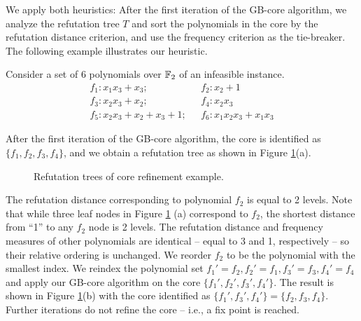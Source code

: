 
We apply both heuristics: After the first iteration of the GB-core
algorithm, we analyze the refutation tree $T$ and sort the polynomials
in the core by the refutation distance criterion, and use the
frequency criterion as the tie-breaker. The following example
illustrates our heuristic.  


\begin{Example} 
Consider a set of 6 polynomials over ${\mathbb{F}}_2$ of an
infeasible instance.
\begin{align*}
f_1: x_1x_3+x_3; & ~~~f_2: x_2 + 1\\
f_3: x_2x_3+x_2; & ~~~f_4: x_2x_3\\
f_5: x_2x_3 + x_2 + x_3 + 1; & ~~~f_6 : x_1x_2x_3 +x_1x_3
\end{align*}

After the first iteration of the GB-core algorithm, the core is
identified as $\{f_1, f_2,f_3,f_4\}$, and we obtain a
refutation tree as shown in Figure \ref{fig:refine}(a).  
\begin{figure}[bp]
\caption{Refutation trees of core refinement example.}
\label{fig:refine}
\end{figure}

The refutation distance corresponding to polynomial $f_2$ is equal to
2 levels. Note that while three leaf nodes in Figure \ref{fig:refine} (a)
correspond to $f_2$, the shortest distance from ``1'' to any $f_2$
node is 2 levels. The refutation distance and frequency measures of
other polynomials are identical -- equal to 3 and 1, respectively --
so their relative ordering is unchanged. We reorder $f_2$ to be the
polynomial with the  smallest index. We reindex the polynomial set 
$f_1'=f_2, f_2' = f_1, f_3' = f_3, f_4' = f_4$
and apply our GB-core algorithm on the core
$\{f_1',f_2',f_3',f_4'\}$. The result is shown in
Figure \ref{fig:refine}(b) with the core identified as $\{f_1', f_3',
f_4'\} = \{f_2,f_3,f_4\}$. Further iterations do not refine the core
-- i.e., a fix point is reached. 
\end{Example}

